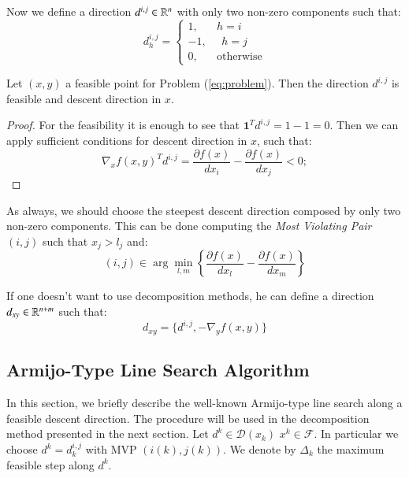 Now we define a direction $d^{i,j} \in \mathbb{R}^n$ with only two non-zero components such that:
\begin{equation}\label{eq:direction}
d_h^{i,j}= 
\begin{cases}
1, \quad \text{    } h=i\\
-1, \text{    } \text{    } h=j\\
0, \quad \text{    } \text{otherwise}
\end{cases}
\end{equation}

\begin{proposition}
Let $(x,y)$ a feasible point for Problem (\ref{eq:problem}). Then the direction $d^{i,j}$ is  feasible and descent direction in $x$.
\end{proposition}
\begin{proof}
For the feasibility it is enough to see that $\mathbf{1}^Td^{i,j}=1-1=0$.
Then we can apply sufficient conditions for descent direction in $x$, such that:
\begin{equation*}
 \nabla_xf(x,y)^Td^{i,j} =  \frac{\partial f(x)}{dx_i} - \frac{\partial f(x)}{dx_j}<0; 
\end{equation*}
\end{proof}

As always, we should choose the steepest descent direction composed by only two non-zero components.
This can be done computing the \emph{Most Violating Pair} $(i,j)$ such that $x_j>l_j$ and:
\begin{equation}
 (i,j) \in \arg \min_{l,m} \left\{\frac{\partial f(x)}{dx_l} - \frac{\partial f(x)}{dx_m}  \right\}
\end{equation}

If one doesn't want to use decomposition methods, he can define a direction $d_{xy} \in \mathbb{R}^{n+m}$ such that:
\begin{equation}
 d_{xy}=\{d^{i,j},-\nabla_yf(x,y)\}
\end{equation}

\subsection{Armijo-Type Line Search Algorithm}
In this section, we briefly describe the well-known Armijo-type line search along a feasible descent direction. The procedure will be used in the decomposition method presented in the next section. 
Let $d^{k} \in \mathcal{D}(x_k)$  $x^{k} \in \mathcal{F}$. In particular we choose $d^{k}=d^{i,j}_k$ with MVP $(i(k),j(k))$.
We denote by $\Delta_{k}$ the maximum feasible step along $d^{k}$. 

